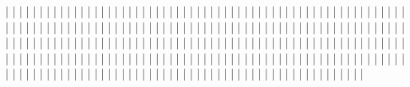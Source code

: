                |       |       |
               |       |       |
               |       |       |
               |       |       |
               |       |       |
               |       |       |
               |       |       |
               |       |       |
               |       |       |
               |       |       |
               |       |       |
               |       |       |
               |       |       |
               |       |       |
               |       |       |
               |       |       |
               |       |       |
               |       |       |
               |       |       |
               |       |       |
               |       |       |
               |       |       |
               |       |       |
               |       |       |
               |       |       |
               |       |       |
               |       |       |
               |       |       |
               |       |       |
               |       |       |
               |       |       |
               |       |       |
               |       |       |
               |       |       |
               |       |       |
               |       |       |
               |       |       |
               |       |       |
               |       |       |
               |       |       |
               |       |       |
               |       |       |
               |       |       |
               |       |       |
               |       |       |
               |       |       |
               |       |       |
               |       |       |
               |       |       |
               |       |       |
               |       |       |
               |       |       |
               |       |       |
               |       |       |
               |       |       |
               |       |       |
               |       |       |
               |       |       |
               |       |       |
               |       |       |
               |       |       |
               |       |       |
               |       |       |
               |       |       |
               |       |       |
               |       |       |
               |       |       |
               |       |       |
               |       |       |
               |       |       |
               |       |       |
               |       |       |
               |       |       |
               |       |       |
               |       |       |
               |       |       |
               |       |       |
               |       |       |
               |       |       |
               |       |       |
               |       |       |
               |       |       |
               |       |       |
               |       |       |
               |       |       |
               |       |       |
               |       |       |
               |       |       |
               |       |       |
               |       |       |
               |       |       |
               |       |       |
               |       |       |
               |       |       |
               |       |       |
               |       |       |
               |